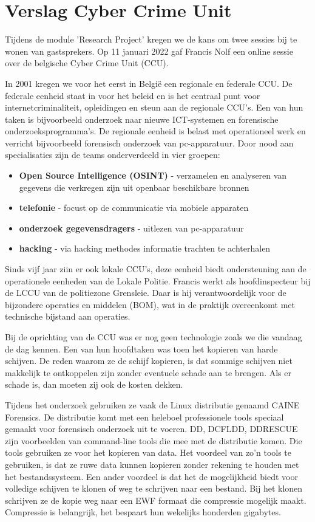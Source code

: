\chapter{Verslag Cyber Crime Unit}

Tijdens de module 'Research Project' kregen we de kans om twee sessies bij te wonen van
gastsprekers. Op 11 januari 2022 gaf Francis Nolf een online sessie over de belgische Cyber Crime
Unit (CCU). 

In 2001 kregen we voor het eerst in België een regionale en federale CCU. De federale eenheid staat
in voor het beleid en is het centraal punt voor internetcriminaliteit, opleidingen en steun aan de
regionale CCU's. Een van hun taken is bijvoorbeeld onderzoek naar nieuwe ICT-systemen en forensische
onderzoeksprogramma's. De regionale eenheid is belast met operationeel werk en verricht bijvoorbeeld
forensisch onderzoek van pc-apparatuur. Door nood aan specialisaties zijn de teams onderverdeeld in
vier groepen:
\begin{itemize}
  \item \textbf{Open Source Intelligence (OSINT)} - verzamelen en analyseren van gegevens die verkregen
    zijn uit openbaar beschikbare bronnen
  \item \textbf{telefonie} - focust op de communicatie via mobiele apparaten
  \item \textbf{onderzoek gegevensdragers} - uitlezen van pc-apparatuur
  \item \textbf{hacking} - via hacking methodes informatie trachten te achterhalen
\end{itemize}

Sinds vijf jaar ziin er ook lokale CCU's, deze eenheid biedt ondersteuning aan de operationele
eenheden van de Lokale Politie. Francis werkt als hoofdinspecteur bij de LCCU van de politiezone
Grensleie. Daar is hij verantwoordelijk voor de bijzondere operaties en middelen (BOM), wat in de
praktijk overeenkomt met technische bijstand aan operaties.

Bij de oprichting van de CCU was er nog geen technologie zoals we die vandaag de dag kennen. Een van
hun hoofdtaken was toen het kopieren van harde schijven. De reden waarom ze de schijf kopieren, is
dat sommige schijven niet makkelijk te ontkoppelen zijn zonder eventuele schade aan te brengen. Als
er schade is, dan moeten zij ook de kosten dekken.

Tijdens het onderzoek gebruiken ze vaak de Linux distributie genaamd CAINE Forensics. De distributie
komt met een heleboel professionele tools speciaal gemaakt voor forensisch onderzoek uit te voeren.
DD, DCFLDD, DDRESCUE zijn voorbeelden van command-line tools die mee met de distributie komen. Die
tools gebruiken ze voor het kopieren van data. Het voordeel van zo'n tools te gebruiken, is dat ze
ruwe data kunnen kopieren zonder rekening te houden met het bestandssysteem. Een ander voordeel is
dat het de mogelijkheid biedt voor volledige schijven te klonen of weg te schrijven naar een
bestand. Bij het klonen schrijven ze de kopie weg naar een EWF formaat die compressie mogelijk
maakt. Compressie is belangrijk, het bespaart hun wekelijks honderden gigabytes.

